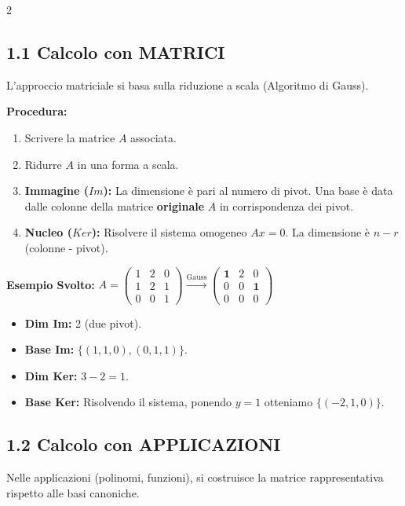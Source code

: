 \documentclass[10pt,a4paper]{article}
\begin{document}
\begin{multicols}{2}

\subsection*{1.1 Calcolo con MATRICI}
L'approccio matriciale si basa sulla riduzione a scala (Algoritmo di Gauss).

\medskip
\textbf{Procedura:}
\begin{enumerate}
    \item Scrivere la matrice $A$ associata.
    \item Ridurre $A$ in una forma a scala.
    \item \textbf{Immagine ($Im$):} La dimensione è pari al numero di pivot. Una base è data dalle colonne della matrice \textbf{originale} $A$ in corrispondenza dei pivot.
    \item \textbf{Nucleo ($Ker$):} Risolvere il sistema omogeneo $Ax = 0$. La dimensione è $n - r$ (colonne - pivot).
\end{enumerate}

\textbf{Esempio Svolto:}
$A = \begin{pmatrix} 1 & 2 & 0 \\ 1 & 2 & 1 \\ 0 & 0 & 1 \end{pmatrix} \xrightarrow{\text{Gauss}} \begin{pmatrix} \mathbf{1} & 2 & 0 \\ 0 & 0 & \mathbf{1} \\ 0 & 0 & 0 \end{pmatrix}$

\begin{itemize}
    \item \textbf{Dim Im:} 2 (due pivot).
    \item \textbf{Base Im:} $\{ (1, 1, 0), (0, 1, 1) \}$.
    \item \textbf{Dim Ker:} $3 - 2 = 1$.
    \item \textbf{Base Ker:} Risolvendo il sistema, ponendo $y=1$ otteniamo $\{ (-2, 1, 0) \}$.
\end{itemize}

\columnbreak

\subsection*{1.2 Calcolo con APPLICAZIONI}
Nelle applicazioni (polinomi, funzioni), si costruisce la matrice rappresentativa rispetto alle basi canoniche.


\end{multicols}
\end{document}
